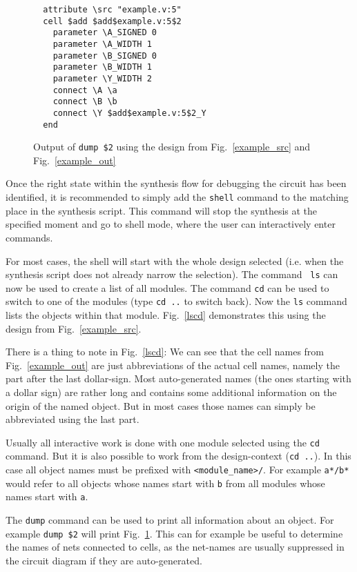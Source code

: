 \documentclass[9pt,technote,a4paper]{IEEEtran}
\begin{document}
\begin{figure}[b]
\begin{lstlisting}
  attribute \src "example.v:5"
  cell $add $add$example.v:5$2
    parameter \A_SIGNED 0
    parameter \A_WIDTH 1
    parameter \B_SIGNED 0
    parameter \B_WIDTH 1
    parameter \Y_WIDTH 2
    connect \A \a
    connect \B \b
    connect \Y $add$example.v:5$2_Y
  end
\end{lstlisting}
\caption{Output of {\tt dump \$2} using the design from Fig.~\ref{example_src} and  Fig.~\ref{example_out}}
\label{dump2}
\end{figure}

Once the right state within the synthesis flow for debugging the circuit has
been identified, it is recommended to simply add the {\tt shell} command
to the matching place in the synthesis script. This command will stop the
synthesis at the specified moment and go to shell mode, where the user can
interactively enter commands.

For most cases, the shell will start with the whole design selected (i.e.  when
the synthesis script does not already narrow the selection). The command {\tt
ls} can now be used to create a list of all modules. The command {\tt cd} can
be used to switch to one of the modules (type {\tt cd ..} to switch back). Now
the {\tt ls} command lists the objects within that module. Fig.~\ref{lscd}
demonstrates this using the design from Fig.~\ref{example_src}.

There is a thing to note in Fig.~\ref{lscd}: We can see that the cell names
from Fig.~\ref{example_out} are just abbreviations of the actual cell names,
namely the part after the last dollar-sign. Most auto-generated names (the ones
starting with a dollar sign) are rather long and contains some additional
information on the origin of the named object. But in most cases those names
can simply be abbreviated using the last part.

Usually all interactive work is done with one module selected using the {\tt cd}
command. But it is also possible to work from the design-context ({\tt cd ..}). In
this case all object names must be prefixed with {\tt <module\_name>/}. For
example {\tt a*/b*} would refer to all objects whose names start with {\tt b} from
all modules whose names start with {\tt a}.

The {\tt dump} command can be used to print all information about an object.
For example {\tt dump \$2} will print Fig.~\ref{dump2}. This can for example
be useful to determine the names of nets connected to cells, as the net-names
are usually suppressed in the circuit diagram if they are auto-generated.
\end{document}
